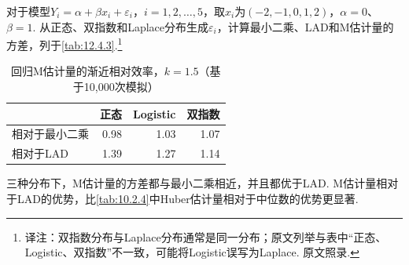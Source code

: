\begin{example}[回归ARE的模拟]\label{ex:12.4.5}
对于模型$Y_i=\alpha+\beta x_i+\varepsilon_i$，$i=1,2,\ldots,5$，取$x_i$为$(-2,-1,0,1,2)$，$\alpha=0$、$\beta=1$. 从正态、双指数和Laplace分布生成$\varepsilon_i$，计算最小二乘、LAD和M估计量的方差，列于\autoref{tab:12.4.3}.\footnote{译注：双指数分布与Laplace分布通常是同一分布；原文列举与表中“正态、Logistic、双指数”不一致，可能将Logistic误写为Laplace. 原文照录.}
\begin{table}[htbp]\centering
\caption{回归M估计量的渐近相对效率，$k=1.5$（基于10,000次模拟）}\label{tab:12.4.3}
\begin{tabular}{lrrr}\toprule
&正态&Logistic&双指数\\\midrule
相对于最小二乘&0.98&1.03&1.07\\
相对于LAD&1.39&1.27&1.14\\\bottomrule
\end{tabular}
\end{table}
三种分布下，M估计量的方差都与最小二乘相近，并且都优于LAD. M估计量相对于LAD的优势，比\autoref{tab:10.2.4}中Huber估计量相对于中位数的优势更显著.
\end{example}

